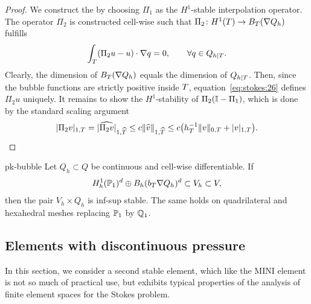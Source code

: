 \begin{proof}
  We construct the  by
   choosing $\Pi_1$ as the
  $H^1$-stable interpolation operator. The operator $\Pi_2$ is
  constructed cell-wise such that $\Pi_2\colon H^1(\cell) \to
  B_\cell(\nabla Q_h)$ fulfills
  \begin{gather}
    \label{eq:stokes:26}    
    \int_\cell (\Pi_2 u - u) \cdot\nabla q = 0,
    \qquad
    \forall q\in Q_{h|\cell}.
  \end{gather}
  Clearly, the dimension of $B_\cell(\nabla Q_h)$ equals the dimension
  of $Q_{h|\cell}$. Then, since the bubble functions are strictly
  positive inside $\cell$, equation~\eqref{eq:stokes:26} defines
  $\Pi_2 u$ uniquely. It remains to show the $H^1$-stability of
  $\Pi_2(\identity-\Pi_1)$, which is done by the standard scaling
  argument
  \begin{gather*}
    \snorm{\Pi_2 v}_{1,\cell}
    =\snorm{\widehat{\Pi_2 v}}_{1,\widehat\cell}
    \le c \norm{\widehat v}_{1,\widehat\cell}
    \le c \bigl(h_\cell^{-1} \norm{v}_{0,\cell} + \snorm{v}_{1,\cell}\bigr).
  \end{gather*}
\end{proof}

\begin{Corollary}{pk-bubble}
  Let $Q_h\subset Q$ be continuous and cell-wise differentiable. If
  \begin{gather*}
    H^1_h(\P_1)^d\oplus B_h(b_\cell\nabla Q_h)^d \subset V_h \subset V,
  \end{gather*}
  then the pair $V_h\times Q_h$ is inf-sup stable. The same holds on
  quadrilateral and hexahedral meshes replacing $\P_1$ by $\Q_1$.
\end{Corollary}

\subsection{Elements with discontinuous pressure}

\begin{intro}
  In this section, we consider a second stable element, which like
  the MINI element is not so much of practical use, but exhibits
  typical properties of the analysis of finite element spaces for the
  Stokes problem.
\end{intro}

